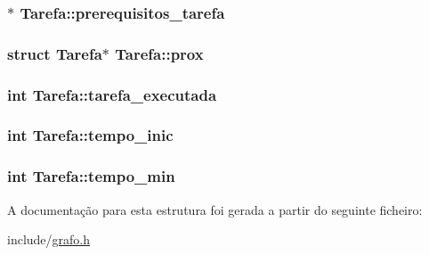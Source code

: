 \hypertarget{structTarefa_abdbaac144f089e939832a4d6cbf0759a}{
\subsubsection[{prerequisitos\-\_\-tarefa}]{$\ast$ Tarefa\-::prerequisitos\-\_\-tarefa}}\label{structTarefa_abdbaac144f089e939832a4d6cbf0759a}
\hypertarget{structTarefa_a1b0bbf147698174596c486d12afa254e}{
\subsubsection[{prox}]{\setlength{\rightskip}{0pt plus 5cm}struct {\bf Tarefa}$\ast$ Tarefa\-::prox}}\label{structTarefa_a1b0bbf147698174596c486d12afa254e}
\hypertarget{structTarefa_a86ef331b855e3f91eec492a00171cc9c}{
\subsubsection[{tarefa\-\_\-executada}]{\setlength{\rightskip}{0pt plus 5cm}int Tarefa\-::tarefa\-\_\-executada}}\label{structTarefa_a86ef331b855e3f91eec492a00171cc9c}
\hypertarget{structTarefa_a202a3c8fbee0bf74488fa057587f13df}{
\subsubsection[{tempo\-\_\-inic}]{\setlength{\rightskip}{0pt plus 5cm}int Tarefa\-::tempo\-\_\-inic}}\label{structTarefa_a202a3c8fbee0bf74488fa057587f13df}
\hypertarget{structTarefa_a4fd1b4c3fd98a3fb754116f6cc80c906}{
\subsubsection[{tempo\-\_\-min}]{\setlength{\rightskip}{0pt plus 5cm}int Tarefa\-::tempo\-\_\-min}}\label{structTarefa_a4fd1b4c3fd98a3fb754116f6cc80c906}


A documentação para esta estrutura foi gerada a partir do seguinte ficheiro\-:\begin{DoxyCompactItemize}
\item 
include/\hyperlink{grafo_8h}{grafo.\-h}\end{DoxyCompactItemize}
